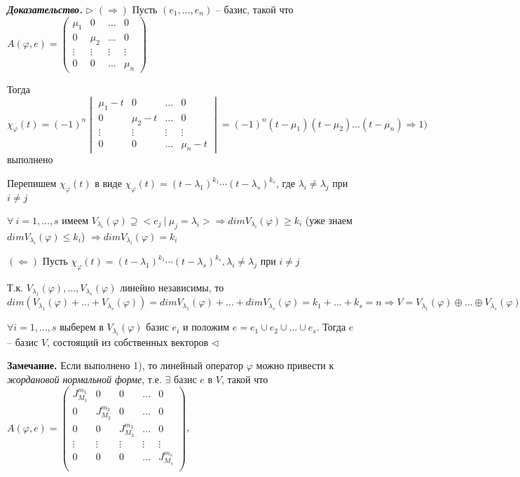 \bigskip
\textbf{\textit{Доказательство.}} $\rhd$ $(\Rightarrow)$ Пусть $(e_1, \dots, e_n)$ -- базис, такой что $A(\varphi, e) = \begin{pmatrix} \mu_1 & 0 & \dots & 0 \\ 0 & \mu_2 & \dots & 0 \\ \vdots & \vdots & \vdots & \vdots \\ 0 & 0 & \dots & \mu_n \end{pmatrix}$

Тогда $\chi_{\varphi} (t) = (-1)^n \begin{vmatrix} \mu_1 - t & 0 & \dots & 0 \\ 0 & \mu_2 - t & \dots & 0 \\ \vdots & \vdots & \vdots & \vdots \\ 0 & 0 & \dots & \mu_n - t \end{vmatrix} = (-1)^n (t - \mu_1) (t - \mu_2) \dots (t - \mu_n) \Rightarrow 1)$ выполнено

Перепишем $\chi_\varphi (t)$ в виде $\chi_\varphi (t) = (t - \lambda_1)^{k_1} \cdots (t - \lambda_s)^{k_s}$, где $\lambda_i \neq \lambda_j$ при $i \neq j$

$\forall \ i = 1, \dots, s$ имеем $V_{\lambda_i} (\varphi) \supseteq <e_j \ | \ \mu_j = \lambda_i > \Rightarrow dim V_{\lambda_i} (\varphi) \geq k_i$ (уже знаем $dim V_{\lambda_i} (\varphi) \leq k_i$) $\Rightarrow dim V_{\lambda_i} (\varphi) = k_i$

\bigskip
$(\Leftarrow)$ Пусть $\chi_{\varphi} (t) = (t - \lambda_1)^{k_1} \cdots  (t - \lambda_s)^{k_s}, \lambda_i \neq \lambda_j$ при $i \neq j$

Т.к. $V_{\lambda_1} (\varphi), \dots, V_{\lambda_s} (\varphi)$ линейно независимы, то $dim (V_{\lambda_1} (\varphi) + \dots + V_{\lambda_s} (\varphi)) = dim V_{\lambda_1} (\varphi) + \dots + dim V_{\lambda_s} (\varphi) = k_1 + \dots + k_s = n \Rightarrow V = V_{\lambda_1} (\varphi) \oplus \dots \oplus V_{\lambda_s} (\varphi)$

$\forall i = 1, \dots, s$ выберем в $V_{\lambda_i} (\varphi)$ базис $e_i$ и положим $e = e_1 \cup e_2 \cup \dots \cup e_s$. Тогда $e$ -- базис $V$, состоящий из собственных векторов $\lhd$

\bigskip
\textbf{Замечание.} Если выполнено 1), то линейный оператор $\varphi$ можно привести к \textit{жордановой нормальной форме}, т.е. $\exists$ базис $e$ в $V$, такой что $A(\varphi, e) = \left(
\begin{array}{c|c|c|c|c}
  J^{m_1}_{M_1} & 0 & 0 & \dots & 0  \\
  \hline
  0 & J^{m_2}_{M_2} & 0 & \dots & 0  \\
  \hline
  0 & 0 & J^{m_3}_{M_3} & \dots & 0 \\
  \hline
  \vdots & \vdots & \vdots & \vdots & \vdots \\
  \hline
  0 & 0 & 0 & \dots & J^{m_s}_{M_s} \\
\end{array}
\right)$,

